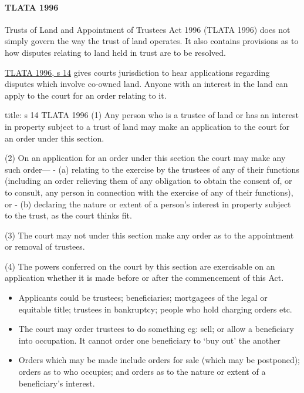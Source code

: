 \documentclass[
]{article}
\newenvironment{Shaded}{}{}
\newcommand{\NormalTok}[1]{#1}
\providecommand{\tightlist}{%
  \setlength{\itemsep}{0pt}\setlength{\parskip}{0pt}}
\begin{document}
\hypertarget{tlata-1996}{%
\paragraph{TLATA 1996}\label{tlata-1996}}

Trusts of Land and Appointment of Trustees Act 1996 (TLATA 1996) does
not simply govern the way the trust of land operates. It also contains
provisions as to how disputes relating to land held in trust are to be
resolved.

\href{https://www.legislation.gov.uk/ukpga/1996/47/section/14}{TLATA
1996, s 14} gives courts jurisdiction to hear applications regarding
disputes which involve co-owned land. Anyone with an interest in the
land can apply to the court for an order relating to it.

\begin{Shaded}
\begin{Highlighting}[]
\NormalTok{title: s 14 TLATA 1996}
\NormalTok{(1) Any person who is a trustee of land or has an interest in property subject to a trust of land may make an application to the court for an order under this section.}

\NormalTok{(2) On an application for an order under this section the court may make any such order—}
\NormalTok{{-} (a) relating to the exercise by the trustees of any of their functions (including an order relieving them of any obligation to obtain the consent of, or to consult, any person in connection with the exercise of any of their functions), or}
\NormalTok{{-} (b) declaring the nature or extent of a person’s interest in property subject to the trust,}
\NormalTok{as the court thinks fit.}

\NormalTok{(3) The court may not under this section make any order as to the appointment or removal of trustees.}

\NormalTok{(4) The powers conferred on the court by this section are exercisable on an application whether it is made before or after the commencement of this Act.}
\end{Highlighting}
\end{Shaded}

\begin{itemize}
\tightlist
\item
  Applicants could be trustees; beneficiaries; mortgagees of the legal
  or equitable title; trustees in bankruptcy; people who hold charging
  orders etc.
\item
  The court may order trustees to do something eg: sell; or allow a
  beneficiary into occupation. It cannot order one beneficiary to `buy
  out' the another
\item
  Orders which may be made include orders for sale (which may be
  postponed); orders as to who occupies; and orders as to the nature or
  extent of a beneficiary's interest.
\end{itemize}
\end{document}
